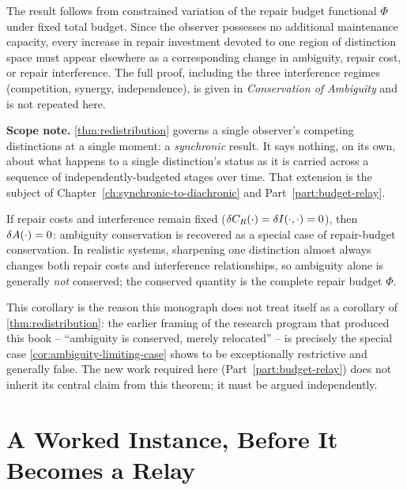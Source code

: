 \begin{proofsketch}
 The result follows from constrained
variation of the repair budget functional $\Phi$ under fixed total
budget. Since the observer possesses no additional maintenance capacity,
every increase in repair investment devoted to one region of distinction
space must appear elsewhere as a corresponding change in ambiguity,
repair cost, or repair interference. The full proof, including the three
interference regimes (competition, synergy, independence), is given in
\emph{Conservation of Ambiguity} and is not repeated here.
\end{proofsketch}

\textbf{Scope note.} \cref{thm:redistribution} governs a single observer's
competing distinctions at a single moment: a \emph{synchronic} result. It
says nothing, on its own, about what happens to a single distinction's
status as it is carried across a sequence of independently-budgeted
stages over time. That extension is the subject of
Chapter~\ref{ch:synchronic-to-diachronic} and Part~\ref{part:budget-relay}.

\begin{corollary}
\label{cor:ambiguity-limiting-case}
If repair costs and interference remain fixed ($\delta C_R(\cdot) =
\delta I(\cdot,\cdot) = 0$), then $\delta A(\cdot) = 0$: ambiguity
conservation is recovered as a special case of repair-budget conservation.
In realistic systems, sharpening one distinction almost always changes
both repair costs and interference relationships, so ambiguity alone is
generally \emph{not} conserved; the conserved quantity is the complete
repair budget $\Phi$.
\end{corollary}

This corollary is the reason this monograph does not treat itself as a
corollary of \cref{thm:redistribution}: the earlier framing of the
research program that produced this book -- ``ambiguity is conserved,
merely relocated'' -- is precisely the special case
\cref{cor:ambiguity-limiting-case} shows to be exceptionally restrictive
and generally false. The new work required here
(Part~\ref{part:budget-relay}) does not inherit its central claim from
this theorem; it must be argued independently.

\section{A Worked Instance, Before It Becomes a Relay}
\label{sec:redistribution-worked}

